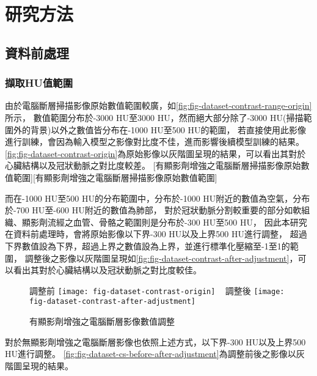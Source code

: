 \documentclass[class=NCU_thesis, crop=false]{standalone}
\begin{document}
\chapter{研究方法}

\section{資料前處理}
\subsection{擷取HU值範圍}
由於電腦斷層掃描影像原始數值範圍較廣，如\cref{fig:fig-dataset-contrast-range-origin}所示，
數值範圍分布於-3000 HU至3000 HU，然而絕大部分除了-3000 HU(掃描範圍外的背景)以外之數值皆分布在-1000 HU至500 HU的範圍，
若直接使用此影像進行訓練，會因為輸入模型之影像對比度不佳，進而影響後續模型訓練的結果。
\cref{fig:fig-dataset-contrast-origin}為原始影像以灰階圖呈現的結果，可以看出其對於心臟結構以及冠狀動脈之對比度較差。
[有顯影劑增強之電腦斷層掃描影像原始數值範圍][有顯影劑增強之電腦斷層掃描影像原始數值範圍]

而在-1000 HU至500 HU的分布範圍中，分布於-1000 HU附近的數值為空氣，分布於-700 HU至-600 HU附近的數值為肺部，
對於冠狀動脈分割較重要的部分如軟組織、顯影劑流經之血管、骨骼之範圍則是分布於-300 HU至500 HU，
因此本研究在資料前處理時，會將原始影像以下界-300 HU以及上界500 HU進行調整，
超過下界數值設為下界，超過上界之數值設為上界，並進行標準化壓縮至-1至1的範圍，
調整後之影像以灰階圖呈現如\cref{fig:fig-dataset-contrast-after-adjustment}，可以看出其對於心臟結構以及冠狀動脈之對比度較佳。

\begin{figure}[!hbt]
    \centering
    \subcaptionbox
        {調整前
        \label{fig:fig-dataset-contrast-origin}}
        {\texttt{[image: fig-dataset-contrast-origin]}}
    ~
    \subcaptionbox
        {調整後
        \label{fig:fig-dataset-contrast-after-adjustment}}
        {\texttt{[image: fig-dataset-contrast-after-adjustment]}}
    \caption{有顯影劑增強之電腦斷層影像數值調整}
    \label{fig:fig-dataset-contrast-before-after-adjustment}
\end{figure}

對於無顯影劑增強之電腦斷層影像也依照上述方式，以下界-300 HU以及上界500 HU進行調整。
\cref{fig:fig-dataset-cs-before-after-adjustment}為調整前後之影像以灰階圖呈現的結果。
\end{document}
